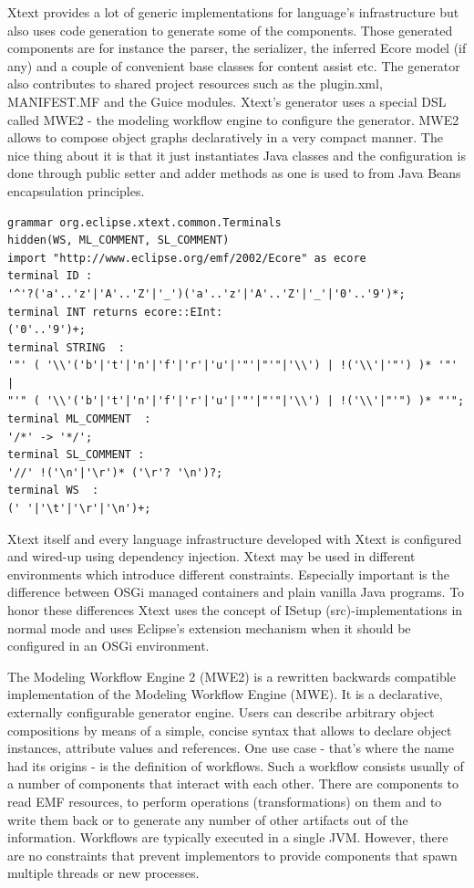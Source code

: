Xtext provides a lot of generic implementations for language's infrastructure but also uses code generation to generate some of the components. Those generated components are for instance the parser, the serializer, the inferred Ecore model (if any) and a couple of convenient base classes for content assist etc. The generator also contributes to shared project resources such as the plugin.xml, MANIFEST.MF and the Guice modules. Xtext's generator uses a special DSL called MWE2 - the modeling workflow engine to configure the generator. MWE2 allows to compose object graphs declaratively in a very compact manner. The nice thing about it is that it just instantiates Java classes and the configuration is done through public setter and adder methods as one is used to from Java Beans encapsulation principles.
\begin{lstlisting}[caption={Common terminal Rules in Xtext },label=lst:xtextCommonTerminalRules]
grammar org.eclipse.xtext.common.Terminals 
hidden(WS, ML_COMMENT, SL_COMMENT)
import "http://www.eclipse.org/emf/2002/Ecore" as ecore
terminal ID : 
'^'?('a'..'z'|'A'..'Z'|'_')('a'..'z'|'A'..'Z'|'_'|'0'..'9')*;
terminal INT returns ecore::EInt: 
('0'..'9')+;
terminal STRING  : 
'"' ( '\\'('b'|'t'|'n'|'f'|'r'|'u'|'"'|"'"|'\\') | !('\\'|'"') )* '"' |
"'" ( '\\'('b'|'t'|'n'|'f'|'r'|'u'|'"'|"'"|'\\') | !('\\'|"'") )* "'"; 
terminal ML_COMMENT  : 
'/*' -> '*/';
terminal SL_COMMENT : 
'//' !('\n'|'\r')* ('\r'? '\n')?;
terminal WS  : 
(' '|'\t'|'\r'|'\n')+;
\end{lstlisting}


Xtext itself and every language infrastructure developed with Xtext is configured and wired-up using dependency injection. Xtext may be used in different environments which introduce different constraints. Especially important is the difference between OSGi managed containers and plain vanilla Java programs. To honor these differences Xtext uses the concept of ISetup (src)-implementations in normal mode and uses Eclipse's extension mechanism when it should be configured in an OSGi environment.


The Modeling Workflow Engine 2 (MWE2) is a rewritten backwards compatible implementation of the Modeling Workflow Engine (MWE). It is a declarative, externally configurable generator engine. Users can describe arbitrary object compositions by means of a simple, concise syntax that allows to declare object instances, attribute values and references. One use case - that's where the name had its origins - is the definition of workflows. Such a workflow consists usually of a number of components that interact with each other. There are components to read EMF resources, to perform operations (transformations) on them and to write them back or to generate any number of other artifacts out of the information. Workflows are typically executed in a single JVM. However, there are no constraints that prevent implementors to provide components that spawn multiple threads or new processes.

